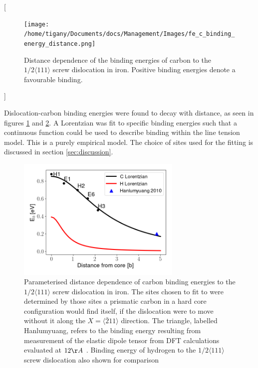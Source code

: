 \documentclass[a4paper,11pt]{article}
\begin{document}
[\begin{figure}[htbp]
\centering
\texttt{[image: /home/tigany/Documents/docs/Management/Images/fe\_c\_binding\_energy\_distance.png]}
\caption{Distance dependence of the binding energies of carbon to the \(1/2\langle 111 \rangle\) screw dislocation in iron. Positive binding energies denote a favourable binding. \label{distancedep}}
\end{figure}]

Dislocation-carbon binding energies were found to decay with distance, as seen in figures
\ref{distancedep} and \ref{lorentzianfit}. A Lorentzian was fit to specific binding energies such
that a continuous function could be used to describe binding within
the line tension model. This is a purely empirical model. The
choice of sites used for the fitting is discussed in section
\ref{sec:discussion}.




\begin{figure}[htbp]
\centering
\includegraphics[width=0.7\textwidth]{Images/binding_energy_dependence_C_H_lorentzian_with_scatter.png}
\caption{Parameterised distance dependence of carbon binding energies to the \(1/2\langle 111 \rangle\) screw dislocation in iron. The sites chosen to fit to were determined by those sites a prismatic carbon in a hard core configuration would find itself, if the dislocation were to move without it along the \(X = \langle\bar{2}11\rangle\) direction. The triangle, labelled Hanlumyuang, refers to the binding energy resulting from measurement of the elastic dipole tensor from DFT calculations evaluated at \(12\AA\) \cite{Hanlumyuang2010}. Binding energy of hydrogen to the \(1/2\langle 111 \rangle\) screw dislocation also shown for comparison \cite{itakura13_effec_hydrog_atoms_screw_disloc} \label{lorentzianfit}}
\end{figure}
\end{document}
